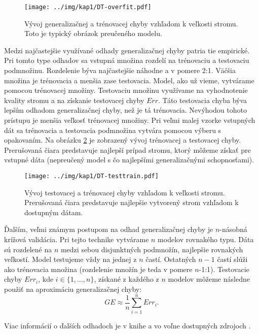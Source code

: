 \begin{figure}[h]
\centering
\centerline{\mbox{\texttt{[image: ../img/kap1/DT-overfit.pdf]}}}
\caption{Vývoj generalizačnej a trénovacej chyby vzhľadom k veľkosti stromu. Toto je typický obrázok preučeného modelu.}\label{fig:overfit}
\end{figure}

Medzi najčastejšie využívané odhady generalizačnej chyby patria tie empirické. Pri tomto type odhadov sa vstupná množina rozdelí na trénovaciu a testovaciu podmnožinu. Rozdelenie býva najčastejšie náhodne a v pomere 2:1. Väčšia množina je trénovacia a menšia zase testovacia. 
Model, ako už vieme, vytvárame pomocou trénovacej množiny. Testovaciu množinu využívame na vyhodnotenie kvality stromu a na získanie testovacej chyby $Err$. Táto testovacia chyba býva lepším odhadom generalizačnej chyby, než je tá trénovacia. Nevýhodou tohoto prístupu je menšia veľkosť trénovacej množiny. Pri veľmi malej vzorke vstupných dát sa trénovacia a testovacia podmnožina vytvára pomocou výberu s opakovaním. Na obrázku \ref{fig:testtrain} je zobrazený vývoj trénovacej a testovacej chyby. Prerušovaná čiara predstavuje najlepší prípad stromu, ktorý môžeme získať pre vstupné dáta (nepreučený model s čo najlepšími generalizačnými schopnosťami).

\begin{figure}[h]
\centering
\centerline{\mbox{\texttt{[image: ../img/kap1/DT-testtrain.pdf]}}}
\caption{Vývoj testovacej a trénovacej chyby vzhľadom k veľkosti stromu. Prerušovaná čiara predstavuje najlepšie vytvorený strom vzhľadom k dostupným dátam.}\label{fig:testtrain}
\end{figure}

Ďalším, veľmi známym postupom na odhad generalizačnej chyby je $n$-násobná krížová validácia. Pri tejto technike vytvárame $n$ modelov rovnakého typu. Dáta sú rozdelené na $n$ medzi sebou disjunktných podmnožín, najlepšie rovnakých veľkostí. Model testujeme vždy na jednej z $n$ častí. Ostatných $n-1$ častí slúži ako trénovacia množina (rozdelenie množín je teda v pomere $n$-1:1). Testovacie chyby $Err_{i}$, kde $i \in \{1,\ldots,n\}$, získané z každého z $n$ modelov môžeme následne použiť na aproximáciu generalizačnej chyby:
\begin{equation}
GE \approx \dfrac{1}{n} \sum_{i=1}^{n} Err_{i}.
\end{equation}

Viac informácií o ďalších odhadoch je v knihe \cite[s. 56]{kap1-DataMiningForTrees} a vo voľne dostupných zdrojoch \cite{wiki-CrossValidation,online-validation}.

